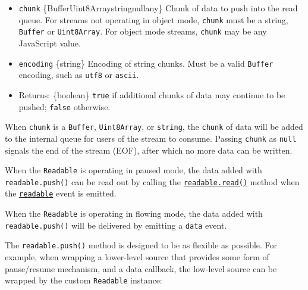 \begin{itemize}
\tightlist
\item
  \texttt{chunk}
  \{Buffer\textbar Uint8Array\textbar string\textbar null\textbar any\}
  Chunk of data to push into the read queue. For streams not operating
  in object mode, \texttt{chunk} must be a string, \texttt{Buffer} or
  \texttt{Uint8Array}. For object mode streams, \texttt{chunk} may be
  any JavaScript value.
\item
  \texttt{encoding} \{string\} Encoding of string chunks. Must be a
  valid \texttt{Buffer} encoding, such as
  \texttt{\textquotesingle{}utf8\textquotesingle{}} or
  \texttt{\textquotesingle{}ascii\textquotesingle{}}.
\item
  Returns: \{boolean\} \texttt{true} if additional chunks of data may
  continue to be pushed; \texttt{false} otherwise.
\end{itemize}

When \texttt{chunk} is a \texttt{Buffer}, \texttt{Uint8Array}, or
\texttt{string}, the \texttt{chunk} of data will be added to the
internal queue for users of the stream to consume. Passing
\texttt{chunk} as \texttt{null} signals the end of the stream (EOF),
after which no more data can be written.

When the \texttt{Readable} is operating in paused mode, the data added
with \texttt{readable.push()} can be read out by calling the
\hyperref[readablereadsize]{\texttt{readable.read()}} method when the
\hyperref[event-readable]{\texttt{\textquotesingle{}readable\textquotesingle{}}}
event is emitted.

When the \texttt{Readable} is operating in flowing mode, the data added
with \texttt{readable.push()} will be delivered by emitting a
\texttt{\textquotesingle{}data\textquotesingle{}} event.

The \texttt{readable.push()} method is designed to be as flexible as
possible. For example, when wrapping a lower-level source that provides
some form of pause/resume mechanism, and a data callback, the low-level
source can be wrapped by the custom \texttt{Readable} instance:

